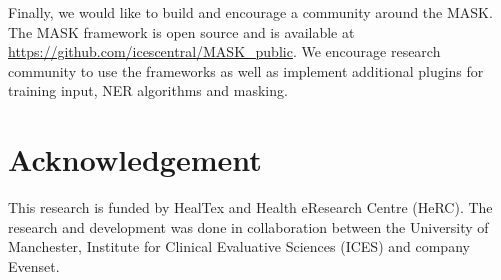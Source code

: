 \documentclass[a4paper,twoside]{article}
\begin{document}
Finally, we would like to build and encourage a community around the MASK. The MASK framework is open source and is available at \url{https://github.com/icescentral/MASK_public}. We encourage research community to use the frameworks as well as implement additional plugins for training input, NER algorithms and masking.  



\section*{Acknowledgement}

This research is funded by HealTex and Health eResearch Centre (HeRC). The research and development was done in collaboration between the University of Manchester, Institute for Clinical Evaluative Sciences (ICES) and company Evenset. 




\vfill
\end{document}
